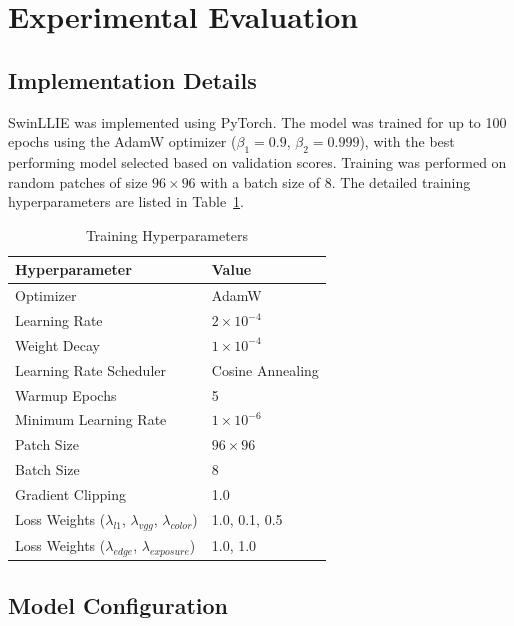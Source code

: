 \documentclass[conference]{IEEEtran}
\begin{document}
\section{Experimental Evaluation}

\subsection{Implementation Details}

SwinLLIE was implemented using PyTorch. The model was trained for up to 100 epochs using the AdamW optimizer ($\beta_1 = 0.9$, $\beta_2 = 0.999$), with the best performing model selected based on validation scores. Training was performed on random patches of size $96 \times 96$ with a batch size of 8. The detailed training hyperparameters are listed in Table~\ref{tab:training_config}.

\begin{table}[htbp]
\caption{Training Hyperparameters}
\centering
\begin{tabular}{ll}
\toprule
\textbf{Hyperparameter} & \textbf{Value} \\
\midrule
Optimizer & AdamW \\
Learning Rate & $2 \times 10^{-4}$ \\
Weight Decay & $1 \times 10^{-4}$ \\
Learning Rate Scheduler & Cosine Annealing \\
Warmup Epochs & 5 \\
Minimum Learning Rate & $1 \times 10^{-6}$ \\
Patch Size & $96 \times 96$ \\
Batch Size & 8 \\
Gradient Clipping & 1.0 \\
\midrule
Loss Weights ($\lambda_{l1}$, $\lambda_{vgg}$, $\lambda_{color}$) & 1.0, 0.1, 0.5 \\
Loss Weights ($\lambda_{edge}$, $\lambda_{exposure}$) & 1.0, 1.0 \\
\bottomrule
\end{tabular}
\label{tab:training_config}
\end{table}

\subsection{Model Configuration}
\end{document}
